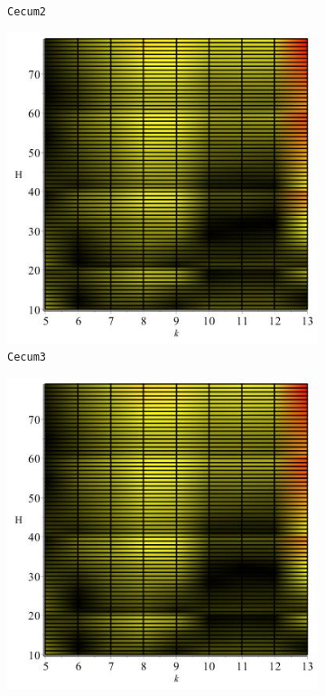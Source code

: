 \documentclass[../../main.tex]{subfiles}
\begin{document}
\begin{figure}[H]
\begin{subfigure}[b]{.5\textwidth}
\caption{\texttt{Cecum2}}
\end{subfigure}
\begin{subfigure}[b]{.5\textwidth}
\includegraphics[width=\textwidth]{precision/minmax/cecum3precise}
\caption{\texttt{Cecum3}}
\end{subfigure}
\begin{subfigure}[b]{.5\textwidth}
\includegraphics[width=\textwidth]{precision/minmax/cecum4precise}

\end{subfigure}
\end{figure}
\end{document}
